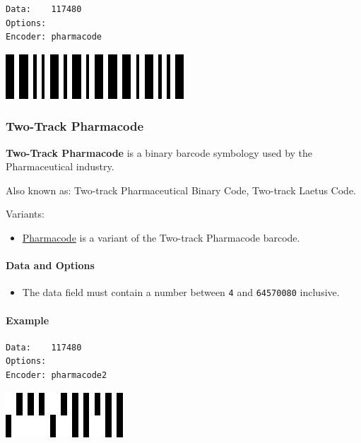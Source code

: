 \begin{verbatim}
Data:    117480
Options: 
Encoder: pharmacode
\end{verbatim}

\includegraphics{images/pharmacode-1.eps}

\hypertarget{two-track-pharmacode}{%
\subsubsection{Two-Track Pharmacode}\label{two-track-pharmacode}}

\textbf{Two-Track Pharmacode} is a binary barcode symbology used by the
Pharmaceutical industry.

Also known as: Two-track Pharmaceutical Binary Code, Two-track Laetus
Code.

Variants:

\begin{itemize}
\tightlist
\item
  \protect\hyperlink{pharmacode}{Pharmacode} is a variant of the
  Two-track Pharmacode barcode.
\end{itemize}

\hypertarget{data-and-options-56}{%
\paragraph{Data and Options}\label{data-and-options-56}}

\begin{itemize}
\tightlist
\item
  The data field must contain a number between \texttt{4} and
  \texttt{64570080} inclusive.
\end{itemize}

\hypertarget{example-17}{%
\paragraph{Example}\label{example-17}}

\begin{verbatim}
Data:    117480
Options: 
Encoder: pharmacode2
\end{verbatim}

\includegraphics{images/pharmacode2-1.eps}

